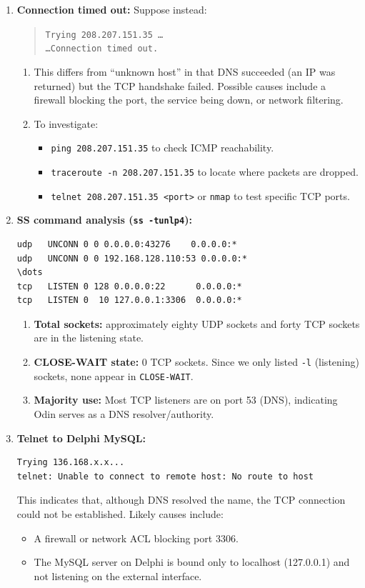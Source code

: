 \documentclass[12pt]{article}
\begin{document}
\begin{enumerate}
\item \textbf{Connection timed out:}  
Suppose instead:
\begin{quote}
\texttt{Trying 208.207.151.35 \dots\\
\dots Connection timed out.}
\end{quote}
\begin{enumerate}
  \item This differs from “unknown host” in that DNS succeeded (an IP was returned) but the TCP handshake failed. Possible causes include a firewall blocking the port, the service being down, or network filtering.
  \item To investigate:
    \begin{itemize}
      \item \texttt{ping 208.207.151.35} to check ICMP reachability.
      \item \texttt{traceroute -n 208.207.151.35} to locate where packets are dropped.
      \item \texttt{telnet 208.207.151.35 <port>} or \texttt{nmap} to test specific TCP ports.
    \end{itemize}
\end{enumerate}

\item \textbf{SS command analysis (\texttt{ss -tunlp4}):}
\begin{lstlisting}[caption={Excerpt of \texttt{ss -tunlp4}}]
udp   UNCONN 0 0 0.0.0.0:43276    0.0.0.0:*       
udp   UNCONN 0 0 192.168.128.110:53 0.0.0.0:*      
\dots                             
tcp   LISTEN 0 128 0.0.0.0:22      0.0.0.0:*       
tcp   LISTEN 0  10 127.0.0.1:3306  0.0.0.0:*       
\end{lstlisting}
\begin{enumerate}
  \item \textbf{Total sockets:} approximately  eighty UDP sockets and forty TCP sockets are in the listening state.
  \item \textbf{CLOSE-WAIT state:} 0 TCP sockets. Since we only listed \texttt{-l} (listening) sockets, none appear in \texttt{CLOSE-WAIT}.
  \item \textbf{Majority use:} Most TCP listeners are on port 53 (DNS), indicating Odin serves as a DNS resolver/authority.
\end{enumerate}

\item \textbf{Telnet to Delphi MySQL:}
\begin{lstlisting}[caption={\texttt{telnet delphi.cs.csubak.edu 3306}}]
Trying 136.168.x.x...
telnet: Unable to connect to remote host: No route to host
\end{lstlisting}
This indicates that, although DNS resolved the name, the TCP connection could not be established. Likely causes include:
\begin{itemize}
  \item A firewall or network ACL blocking port 3306.
  \item The MySQL server on Delphi is bound only to localhost (127.0.0.1) and not listening on the external interface.
\end{itemize}

\end{enumerate}
\end{document}
